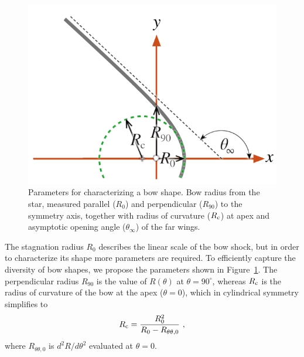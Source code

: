 \begin{figure}
  \centering
  \includegraphics[width=\linewidth]{figs/characteristic-radii}
  \caption[]{Parameters for characterizing a bow shape.  Bow radius
    from the star, measured parallel (\(R_0\)) and perpendicular
    (\(R_{90}\)) to the symmetry axis, together with radius of
    curvature (\(R_{\mathrm{c}}\)) at apex and asymptotic opening angle
    (\(\theta_\infty\)) of the far wings. }
  \label{fig:characteristic-radii}
\end{figure}

The stagnation radius \(R_0\) describes the linear scale of the bow
shock, but in order to characterize its shape more parameters are
required.  To efficiently capture the diversity of bow shapes, we
propose the parameters shown in Figure~\ref{fig:characteristic-radii}.
The perpendicular radius \(R_{90}\) is the value of \(R(\theta)\) at
\(\theta = 90^\circ\), whereas \(R_{\mathrm{c}}\) is the radius of curvature of the bow at
the apex (\(\theta = 0\)), which in cylindrical symmetry simplifies to
\begin{equation}
  \label{eq:radius-curvature}
  R_{\mathrm{c}} 
  = \frac{R_0^2}{R_0 - R_{\theta\theta,0}} \ , 
\end{equation}
where \(R_{\theta\theta,0}\) is \(d^2 \!R / d\theta^2\) evaluated at \(\theta = 0\).

